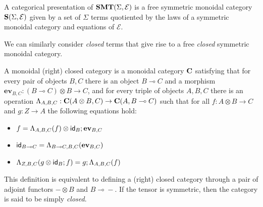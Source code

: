 \begin{definition}
A categorical presentation of  $\mathbf{SMT}(\Sigma, \mathcal{E})$ is a free symmetric monoidal category $\mathbf{S}(\Sigma, \mathcal{E})$ given by a set of $\Sigma$ terms quotiented by the laws of a symmetric monoidal category and equations of $\mathcal{E}$.
\end{definition}

We can similarly consider \textit{closed} terms that give rise to a free \textit{closed} symmetric monoidal category.

\begin{definition}
\label{def:closed}
A monoidal (right) closed category is a monoidal category $\mathbf{C}$ satisfying that for
every pair of objects $B,C$ there is an object $B \multimap C$ and a morphism $\textbf{ev}_{B,C} : (B \multimap C) \otimes B \to
C$, and for every triple of objects $A,B,C$ there is an operation $\Lambda_{A,B,C} : \mathbf{C}(A \otimes B,C) \to
\mathbf{C}(A,B \multimap{} C)$ such that for all $f : A \otimes B \to C$ and $g : Z \to A$ the following equations hold:
\begin{itemize}
\item $f = \Lambda_{A,B,C}(f) \otimes \textsf{id}_{B}; \textbf{ev}_{B,C}$
\item $\textsf{id}_{B \multimap{} C} = \Lambda_{B \multimap{} C,B,C}(\textbf{ev}_{B,C})$
\item $\Lambda_{Z,B,C}(g \otimes \textsf{id}_{B}; f) = g;\Lambda_{A,B,C}(f)$
\end{itemize}
\end{definition}

This definition is equivalent to defining a (right) closed category through a pair of adjoint functors $- \otimes B$ and $B \multimap{} -$.
If the tensor is symmetric, then the category is said to be simply \textit{closed}.

